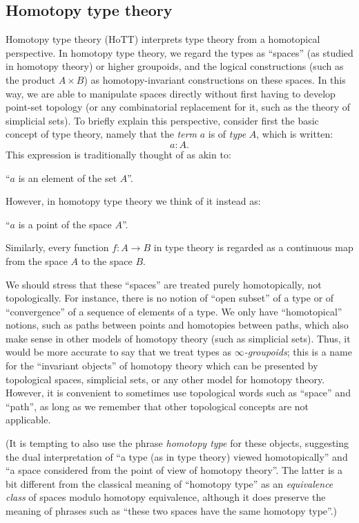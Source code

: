 \subsection{Homotopy type theory}

Homotopy type theory (HoTT) interprets type theory from a homotopical perspective.
In homotopy type theory, we regard the types as ``spaces'' (as studied in homotopy theory) or higher groupoids, and the logical constructions (such as the product $A\times B$) as homotopy-invariant constructions on these spaces.
In this way, we are able to manipulate spaces directly without first having to develop point-set topology (or any combinatorial replacement for it, such as the theory of simplicial sets).
To briefly explain this perspective, consider first the basic concept of type theory, namely that
the \emph{term} $a$ is of \emph{type} $A$, which is written:
\[ a:A. \]
This expression is traditionally thought of as akin to:
\begin{center}
``$a$ is an element of the set $A$''.
\end{center}
However, in homotopy type theory we think of it instead as:
\begin{center}
``$a$ is a point of the space $A$''.
\end{center}
Similarly, every function $f : A\to B$ in type theory is regarded as a continuous map from the space $A$ to the space $B$.

We should stress that these ``spaces'' are treated purely homotopically, not topologically.
For instance, there is no notion of ``open subset'' of a type or of ``convergence'' of a sequence of elements of a type.
We only have ``homotopical'' notions, such as paths between points and homotopies between paths, which also make sense in other models of homotopy theory (such as simplicial sets).
Thus, it would be more accurate to say that we treat types as \emph{$\infty$-groupoids}; this is a name for the ``invariant objects'' of homotopy theory which can be presented by topological spaces,
simplicial sets, or any other model for homotopy theory.
However, it is convenient to sometimes use topological words such as ``space'' and ``path'', as long as we remember that other topological concepts are not applicable.

(It is tempting to also use the phrase \emph{homotopy type}
for these objects, suggesting the dual interpretation of ``a type (as in type theory) viewed homotopically'' and ``a space considered from the point of view of homotopy theory''.
The latter is a bit different from the classical meaning of ``homotopy type'' as an \emph{equivalence class} of spaces modulo homotopy equivalence, although it does preserve the meaning of phrases such as ``these two spaces have the same homotopy type''.)

